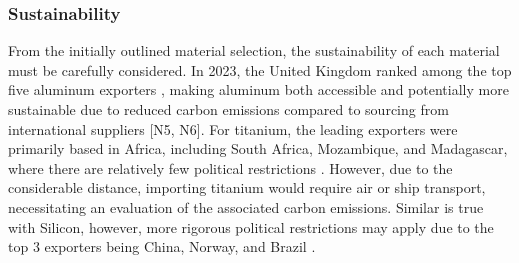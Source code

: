 \subsubsection{Sustainability}
From the initially outlined material selection, the sustainability of each material must be carefully considered. In 2023, the United Kingdom ranked among the top five aluminum exporters \cite{worldbank2023aluminum}, making aluminum both accessible and potentially more sustainable due to reduced carbon emissions compared to sourcing from international suppliers [N5, N6]. For titanium, the leading exporters were primarily based in Africa, including South Africa, Mozambique, and Madagascar, where there are relatively few political restrictions \cite{worldbank2023titanium}. However, due to the considerable distance, importing titanium would require air or ship transport, necessitating an evaluation of the associated carbon emissions. Similar is true with Silicon, however, more rigorous political restrictions may apply due to the top 3 exporters being China, Norway, and Brazil \cite{worldbank2023silicon}.
\vspace{1.5mm}

